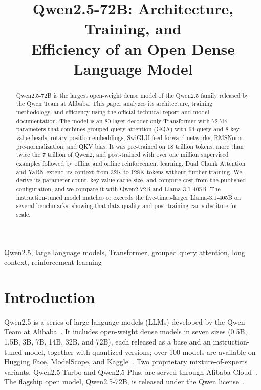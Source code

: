 \documentclass[conference]{IEEEtran}
\begin{document}
\title{Qwen2.5-72B: Architecture, Training, and\\Efficiency of an Open Dense Language Model}

\author{
}

\maketitle

\begin{abstract}
Qwen2.5-72B is the largest open-weight dense model of the Qwen2.5 family released by the Qwen Team at Alibaba. This paper analyzes its architecture, training methodology, and efficiency using the official technical report and model documentation. The model is an 80-layer decoder-only Transformer with 72.7B parameters that combines grouped query attention (GQA) with 64 query and 8 key-value heads, rotary position embeddings, SwiGLU feed-forward networks, RMSNorm pre-normalization, and QKV bias. It was pre-trained on 18 trillion tokens, more than twice the 7 trillion of Qwen2, and post-trained with over one million supervised examples followed by offline and online reinforcement learning. Dual Chunk Attention and YaRN extend its context from 32K to 128K tokens without further training. We derive its parameter count, key-value cache size, and compute cost from the published configuration, and we compare it with Qwen2-72B and Llama-3.1-405B. The instruction-tuned model matches or exceeds the five-times-larger Llama-3.1-405B on several benchmarks, showing that data quality and post-training can substitute for scale.
\end{abstract}

\begin{IEEEkeywords}
Qwen2.5, large language models, Transformer, grouped query attention, long context, reinforcement learning
\end{IEEEkeywords}

\section{Introduction}
Qwen2.5 is a series of large language models (LLMs) developed by the Qwen Team at Alibaba~\cite{qwen25}. It includes open-weight dense models in seven sizes (0.5B, 1.5B, 3B, 7B, 14B, 32B, and 72B), each released as a base and an instruction-tuned model, together with quantized versions; over 100 models are available on Hugging Face, ModelScope, and Kaggle~\cite{qwen25}. Two proprietary mixture-of-experts variants, Qwen2.5-Turbo and Qwen2.5-Plus, are served through Alibaba Cloud~\cite{qwen25}. The flagship open model, Qwen2.5-72B, is released under the Qwen license~\cite{qwen25,qwen25card}.
\end{document}
